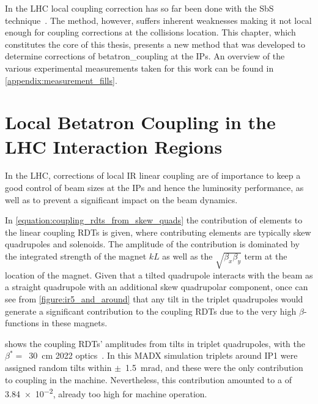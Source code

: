 In the LHC local coupling correction has so far been done with the SbS technique~\cite{PRAB:Tomas:CERN_LHC_OMC}.
The method, however, suffers inherent weaknesses making it not local enough for coupling corrections at the collisions location.
This chapter, which constitutes the core of this thesis, presents a new method that was developed to determine corrections of \gls{betatron_coupling} at the \glspl{IP}.
An overview of the various experimental measurements taken for this work can be found in \cref{appendix:measurement_fills}.


\section{Local Betatron Coupling in the LHC Interaction Regions}
\label{section:local_ir_coupling}

In the LHC, corrections of local \gls{IR} linear coupling are of importance to keep a good control of beam sizes at the IPs and hence the luminosity performance, as well as to prevent a significant impact on the beam dynamics.

In \cref{equation:coupling_rdts_from_skew_quads} the contribution of elements to the linear coupling \glspl{RDT} is given, where contributing elements are typically skew quadrupoles and solenoids.
The amplitude of the contribution is dominated by the integrated strength of the magnet \(k L\) as well as the \(\sqrt{\beta_x \beta_y}\) term at the location of the magnet.
Given that a tilted quadrupole interacts with the beam as a straight quadrupole with an additional \gls{skew} quadrupolar component, once can see from \cref{figure:ir5_and_around} that any tilt in the triplet quadrupoles would generate a significant contribution to the coupling RDTs due to the very high \(\beta\)-functions in these magnets.

 shows the coupling RDTs' amplitudes from tilts in triplet quadrupoles, with the \(\beta^{\ast} =\)~\qty{30}{\centi\meter} \num{2022} optics~\cite{CODE:acc-models-lhc}.
In this \gls{MADX} simulation triplets around IP\num{1} were assigned random tilts within \(\pm\)~\qty{1.5}{\milli\radian}, and these were the only contribution to coupling in the machine.
Nevertheless, this contribution amounted to a  of \num{3.84e-2}, already too high for machine operation.


